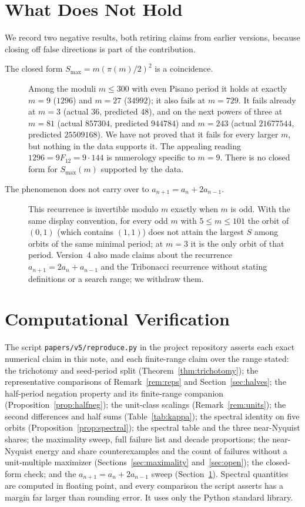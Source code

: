 \documentclass[12pt]{article}
\theoremstyle{remark}
\begin{document}
\section{What Does Not Hold}\label{sec:negatives}

We record two negative results, both retiring claims from earlier versions, because closing
off false directions is part of the contribution.

\begin{description}
\item[The closed form $S_{\max}=m(\pi(m)/2)^2$ is a coincidence.] Among the moduli
$m\le 300$ with even Pisano period it holds at exactly $m=9$ ($1296$) and $m=27$
($34992$); it also fails at $m=729$. It fails already at $m=3$ (actual $36$, predicted
$48$), and on the next powers of three at $m=81$ (actual $857304$, predicted $944784$) and
$m=243$ (actual $21677544$, predicted $25509168$). We have not proved that it fails for
every larger $m$, but nothing in the data supports it. The appealing reading
$1296=9F_{12}=9\cdot 144$ is numerology specific to $m=9$. There is no closed form for
$S_{\max}(m)$ supported by the data.
\item[The phenomenon does not carry over to $a_{n+1}=a_n+2a_{n-1}$.] This recurrence is
invertible modulo $m$ exactly when $m$ is odd. With the same display convention, for every
odd $m$ with $5\le m\le 101$ the orbit of $(0,1)$ (which contains $(1,1)$) does not attain
the largest $S$ among orbits of the same minimal period; at $m=3$ it is the only orbit of
that period. Version~4 also made claims about the recurrence $a_{n+1}=2a_n+a_{n-1}$ and the
Tribonacci recurrence without stating definitions or a search range; we withdraw them.
\end{description}

\section{Computational Verification}\label{sec:verify}

The script \texttt{papers/v5/reproduce.py} in the project repository asserts each exact
numerical claim in this note, and each finite-range claim over the range stated: the
trichotomy and seed-period split (Theorem~\ref{thm:trichotomy}); the representative
comparisons of Remark~\ref{rem:reps} and Section~\ref{sec:halves}; the half-period
negation property and its finite-range companion (Proposition~\ref{prop:halfneg}); the
unit-class scalings (Remark~\ref{rem:units}); the second differences and half sums
(Table~\ref{tab:kappa}); the spectral identity on five orbits
(Proposition~\ref{prop:spectral}); the spectral table and the three near-Nyquist shares;
the maximality sweep, full failure list and decade proportions; the near-Nyquist energy and
share counterexamples and the count of failures without a unit-multiple maximizer
(Sections~\ref{sec:maximality} and~\ref{sec:open}); the closed-form check; and the
$a_{n+1}=a_n+2a_{n-1}$ sweep (Section~\ref{sec:negatives}). Spectral quantities are
computed in floating point, and every comparison the script asserts has a margin far
larger than rounding error. It uses only the Python standard library.
\end{document}
